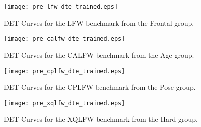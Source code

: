 \documentclass[class=report, crop=false, a4paper, 12pt]{standalone}
\begin{document}
\begin{figure}[H]
    \centering
    \begin{adjustbox}{center, minipage=1.1\textwidth, margin=0cm -0.1cm 0cm -0.1cm}  %
        \begin{minipage}[c]{0.49\textwidth}
            \centering
            \texttt{[image: pre\_lfw\_dte\_trained.eps]}
            \caption{DET Curves for the LFW benchmark from the Frontal group.}
            \label{fig:dte_lfw}
        \end{minipage}
        \hfill
        \begin{minipage}[c]{0.49\textwidth}
            \centering
            \texttt{[image: pre\_calfw\_dte\_trained.eps]}
            \caption{DET Curves for the CALFW benchmark from the Age group.}
            \label{fig:dte_calfw}
        \end{minipage}
    \end{adjustbox}
    \vspace{-0.4cm}
  \end{figure}
  
\begin{figure}[H]
\begin{adjustbox}{center, minipage=1.2\textwidth, margin=0cm -0.1cm 0cm -0.1cm}  %
    \begin{minipage}[c]{0.49\textwidth}
        \centering
        \texttt{[image: pre\_cplfw\_dte\_trained.eps]}
        \caption{DET Curves for the CPLFW benchmark from the Pose group.}
        \label{fig:dte_cplfw}
    \end{minipage}
    \hfill
    \begin{minipage}[c]{0.49\textwidth}
        \centering
        \texttt{[image: pre\_xqlfw\_dte\_trained.eps]}
        \caption{DET Curves for the XQLFW benchmark from the Hard group.}
        \label{fig:dte_xqlfw}
    \end{minipage}
\end{adjustbox}
\vspace{-0.4cm}
\end{figure}
\end{document}
